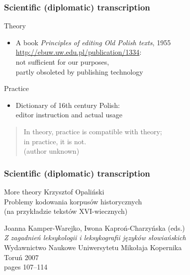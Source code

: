 \documentclass[pdfpagemode=UseNone]{beamer}
\begin{document}
\begin{frame}
  \frametitle{Scientific (diplomatic) transcription}
  \begin{block}{Theory}
    \begin{itemize}
    \item A book \textit{Principles of editing Old Polish texts}, 1955\\
      \url{http://ebuw.uw.edu.pl/publication/1334}:\\
      not sufficient for our purposes,\\ partly obsoleted by publishing technology
    \end{itemize}
  \end{block}
  \begin{block}{Practice}
    \begin{itemize}
    \item Dictionary of 16th century Polish:\\editor instruction and actual usage
    \end{itemize}
  \end{block}
  \begin{quote}
    In theory, practice is compatible with theory;\\
    in practice, it is not.\\
    (author unknown)
  \end{quote}
\end{frame}
\begin{frame}
  \frametitle{Scientific (diplomatic) transcription}
  \begin{block}{More theory}
    Krzysztof Opaliński\\
    Problemy kodowania korpusów historycznych\\
    (na przykładzie tekstów XVI-wiecznych)

    \bigskip
    Joanna Kamper-Warejko, Iwona Kaproń-Charzyńska (eds.)\\
    \textit{Z zagadnień leksykologii i leksykografii języków słowiańskich}\\
    Wydawnictwo Naukowe Uniwersytetu Mikołaja Kopernika\\
    Toruń 2007\\
    pages 107--114

  \end{block}
\end{frame}
\end{document}
